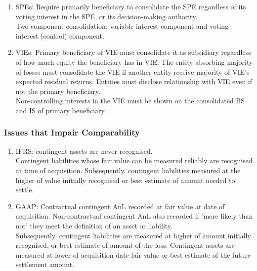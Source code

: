 \begin{method} 
\begin{enumerate}[label=\roman*.]
\setlength{\itemsep}{0pt}
\item SPEs: Require primarily beneficiary to consolidate the SPE regardless of its voting interest in the SPE, or its decision-making authority.\\
Two-component consolidation: variable interest component and voting interest (control) component.
\item VIEs: Primary beneficiary of VIE must consolidate it as subsidiary regardless of how much equity the beneficiary has in VIE. The entity absorbing majority of losses must consolidate the VIE if another entity receive majority of VIE’s expected residual returns. Entities must disclose relationship with VIE even if not the primary beneficiary.\\
Non-controlling interests in the VIE must be shown on the consolidated BS and IS of primary beneficiary. 
\end{enumerate}
\end{method}

\subsubsection{Issues that Impair Comparability}

\begin{remark} 
\begin{enumerate}[label=\roman*.]
\setlength{\itemsep}{0pt}
\item IFRS: contingent assets are never recognised.\\
Contingent liabilities whose fair value can be measured reliably are recognised at time of acquisition. Subsequently, contingent liabilities measured at the higher of value initially recognised or best estimate of amount needed to settle.
\item GAAP: Contractual contingent AnL recorded at fair value at date of acquisition. Non-contractual contingent AnL also recorded if 'more likely than not' they meet the definition of an asset or liability.\\
Subsequently, contingent liabilities are measured at higher of amount initially recognised, or best estimate of amount of the loss. Contingent assets are measured at lower of acquisition date fair value or best estimate of the future settlement amount.
\end{enumerate}
\end{remark}

